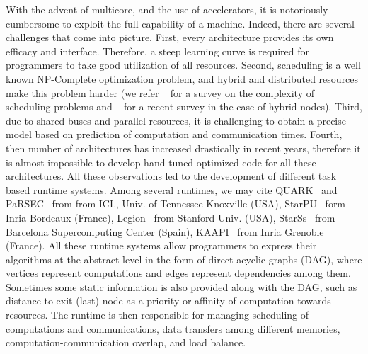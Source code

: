 \documentclass[sigconf]{acmart}
\begin{document}
	With the advent of multicore, and the use of accelerators, it is notoriously cumbersome to exploit the full capability of a machine. Indeed, there are several challenges that come into picture. First, every architecture provides its own efficacy and interface. Therefore, a steep learning curve is required for programmers to take good utilization of all resources. Second, scheduling is a well known NP-Complete optimization problem, and hybrid and distributed resources make this problem harder (we refer ~\cite{webpagescheduling} for a survey on the complexity of scheduling problems and ~\cite{bleuse2015scheduling} for a recent survey in the case of hybrid nodes). Third, due to shared buses and parallel resources, it is challenging to obtain a precise model based on prediction of computation and communication times. Fourth, then number of architectures has increased drastically in recent years, therefore it is almost impossible to develop hand tuned optimized code for all these architectures. All these observations led to the development of different task based runtime systems. Among several runtimes, we may cite QUARK~\cite{YarKhan:2011:Quark:Manual} and PaRSEC~\cite{parsec} from from ICL, Univ. of Tennessee Knoxville (USA), StarPU~\cite{starpu} form Inria Bordeaux (France), Legion~\cite{legion12} from Stanford Univ. (USA), StarSs~\cite{ompss} from Barcelona Supercomputing Center (Spain), KAAPI~\cite{kaapi} from Inria Grenoble (France). All these runtime systems allow programmers to express their algorithms at the abstract level in the form of direct acyclic graphs (DAG), where vertices represent computations and edges represent dependencies among them. Sometimes some static information is also provided along with the DAG, such as distance to exit (last) node as a priority or affinity of computation towards resources. The runtime is then responsible for managing scheduling of computations and communications, data transfers among different memories, computation-communication overlap, and load balance.
	
	
	
\end{document}
